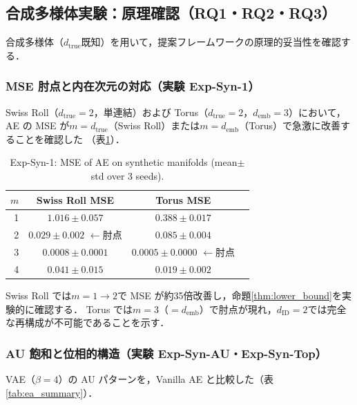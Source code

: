 \documentclass[11pt,a4paper]{jsarticle}
\newcommand{\dID}{d_{\mathrm{ID}}}
\newcommand{\dtrue}{d_{\mathrm{true}}}
\newcommand{\demb}{d_{\mathrm{emb}}}
\begin{document}
\subsection{合成多様体実験：原理確認（RQ1・RQ2・RQ3）}\label{sec:exp_synthetic}

合成多様体（$\dtrue$既知）を用いて，提案フレームワークの原理的妥当性を確認する．

\subsubsection{MSE 肘点と内在次元の対応（実験 Exp-Syn-1）}

Swiss Roll（$\dtrue = 2$，単連結）および Torus（$\dtrue = 2$，$\demb = 3$）において，
AE の MSE が$m = \dtrue$（Swiss Roll）または$m = \demb$（Torus）で急激に改善することを確認した
（表\ref{tab:e1}）．

\begin{table}[H]
\centering
\caption{Exp-Syn-1: MSE of AE on synthetic manifolds (mean$\pm$std over 3 seeds).}
\label{tab:e1}
\small
\begin{tabular}{rccc}
\toprule
$m$ & Swiss Roll MSE & Torus MSE \\
\midrule
1 & $1.016\pm0.057$ & $0.388\pm0.017$ \\
2 & $\boldsymbol{0.029\pm0.002}$ $\leftarrow$肘点 & $0.085\pm0.004$ \\
3 & $0.0008\pm0.0001$ & $\boldsymbol{0.0005\pm0.0000}$ $\leftarrow$肘点 \\
4 & $0.041\pm0.015$ & $0.019\pm0.002$ \\
\bottomrule
\end{tabular}
\end{table}

Swiss Roll では$m = 1 \to 2$で MSE が約35倍改善し，命題\ref{thm:lower_bound}を実験的に確認する．
Torus では$m = 3$（$= \demb$）で肘点が現れ，$\dID = 2$では完全な再構成が不可能であることを示す．

\subsubsection{AU 飽和と位相的構造（実験 Exp-Syn-AU・Exp-Syn-Top）}

VAE（$\beta = 4$）の AU パターンを，Vanilla AE と比較した（表\ref{tab:ea_summary}）．
\end{document}
